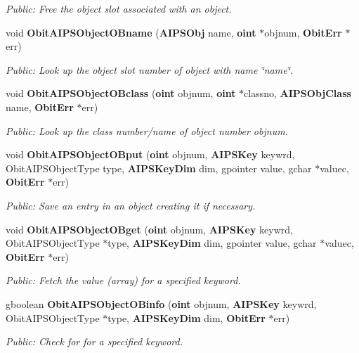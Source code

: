 \begin{CompactItemize}
\begin{CompactList}\small\item\em Public: Free the object slot associated with an object. \item\end{CompactList}\item 
void {\bf Obit\-AIPSObject\-OBname} ({\bf AIPSObj} name, {\bf oint} $\ast$objnum, {\bf Obit\-Err} $\ast$err)
\begin{CompactList}\small\item\em Public: Look up the object slot number of object with name \char`\"{}name\char`\"{}. \item\end{CompactList}\item 
void {\bf Obit\-AIPSObject\-OBclass} ({\bf oint} objnum, {\bf oint} $\ast$classno, {\bf AIPSObj\-Class} name, {\bf Obit\-Err} $\ast$err)
\begin{CompactList}\small\item\em Public: Look up the class number/name of object number objnum. \item\end{CompactList}\item 
void {\bf Obit\-AIPSObject\-OBput} ({\bf oint} objnum, {\bf AIPSKey} keywrd, Obit\-AIPSObject\-Type type, {\bf AIPSKey\-Dim} dim, gpointer value, gchar $\ast$valuec, {\bf Obit\-Err} $\ast$err)
\begin{CompactList}\small\item\em Public: Save an entry in an object creating it if necessary. \item\end{CompactList}\item 
void {\bf Obit\-AIPSObject\-OBget} ({\bf oint} objnum, {\bf AIPSKey} keywrd, Obit\-AIPSObject\-Type $\ast$type, {\bf AIPSKey\-Dim} dim, gpointer value, gchar $\ast$valuec, {\bf Obit\-Err} $\ast$err)
\begin{CompactList}\small\item\em Public: Fetch the value (array) for a specified keyword. \item\end{CompactList}\item 
gboolean {\bf Obit\-AIPSObject\-OBinfo} ({\bf oint} objnum, {\bf AIPSKey} keywrd, Obit\-AIPSObject\-Type $\ast$type, {\bf AIPSKey\-Dim} dim, {\bf Obit\-Err} $\ast$err)
\begin{CompactList}\small\item\em Public: Check for for a specified keyword. \item\end{CompactList}\item 

\end{CompactItemize}
